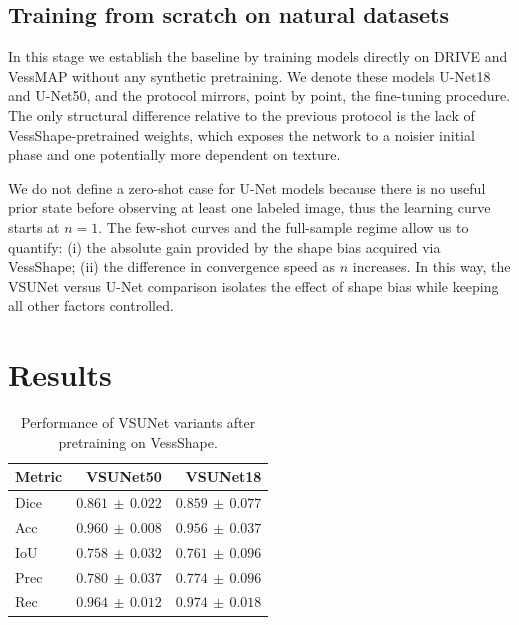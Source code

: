 \documentclass[%
reprint,
nofootinbib,
 amsmath,amssymb,
aps,
superscriptaddress,
showkeys,
longbibliography
]{revtex4-1}
\begin{document}
\subsection{Training from scratch on natural datasets}

In this stage we establish the baseline by training models directly on DRIVE and VessMAP without any synthetic pretraining. We denote these models U-Net18 and U-Net50, and the protocol mirrors, point by point, the fine-tuning procedure. The only structural difference relative to the previous protocol is the lack of VessShape-pretrained weights, which exposes the network to a noisier initial phase and one potentially more dependent on texture.

We do not define a zero-shot case for U-Net models because there is no useful prior state before observing at least one labeled image, thus the learning curve starts at $n=1$. The few-shot curves and the full-sample regime allow us to quantify: (i) the absolute gain provided by the shape bias acquired via VessShape; (ii) the difference in convergence speed as $n$ increases. In this way, the VSUNet versus U-Net comparison isolates the effect of shape bias while keeping all other factors controlled.


\section{Results}
\label{s:results}

\begin{table}[t]
    \caption{Performance of VSUNet variants after pretraining on VessShape.}
    \label{tab:vessshape_results}
    \centering
    \begingroup
    \small
    \setlength{\tabcolsep}{6pt}
    \renewcommand{\arraystretch}{1.15}
    \begin{tabular}{l r r}
        \hline
        	\textbf{Metric} & \textbf{VSUNet50} & \textbf{VSUNet18} \\
        \hline
        Dice & $0.861 \,\pm\, 0.022$ & $0.859 \,\pm\, 0.077$ \\
        Acc & $0.960 \,\pm\, 0.008$ & $0.956 \,\pm\, 0.037$ \\
        IoU & $0.758 \,\pm\, 0.032$ & $0.761 \,\pm\, 0.096$ \\
        Prec & $0.780 \,\pm\, 0.037$ & $0.774 \,\pm\, 0.096$ \\
        Rec & $0.964 \,\pm\, 0.012$ & $0.974 \,\pm\, 0.018$ \\
        \hline
    \end{tabular}
    \endgroup
\end{table}
\end{document}
